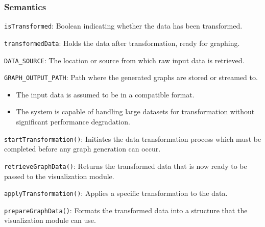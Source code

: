 \documentclass[12pt, titlepage]{article}
\begin{document}
\subsubsection{Semantics}
\begin{description}
  \item[State Variables:]
  \item \texttt{isTransformed}: Boolean indicating whether the data has been transformed.
  \item \texttt{transformedData}: Holds the data after transformation, ready for graphing.
  \item
  \item[Environment Variables:]
  \item \texttt{DATA\_SOURCE}: The location or source from which raw input data is retrieved.
  \item \texttt{GRAPH\_OUTPUT\_PATH}: Path where the generated graphs are stored or streamed to.
  \item 

  \item[Assumptions:]
  \item
  \begin{itemize}
    \item The input data is assumed to be in a compatible format.
  \end{itemize}
  \item 
  \begin{itemize}
    \item The system is capable of handling large datasets for transformation without significant 
    performance degradation.
  \end{itemize}
  \item 

  \item[Access Routine Semantics:] 
  \item \texttt{startTransformation()}: Initiates the data transformation process which must be completed before 
  any graph generation can occur.
  \item \texttt{retrieveGraphData()}: Returns the transformed data that is now ready to be passed to the visualization 
  module.
  \item
  \item[Local Function:] 
  \item \texttt{applyTransformation()}: Applies a specific transformation to the data.
  \item \texttt{prepareGraphData()}: Formats the transformed data into a structure that the visualization module can use.
\end{description}
\end{document}
